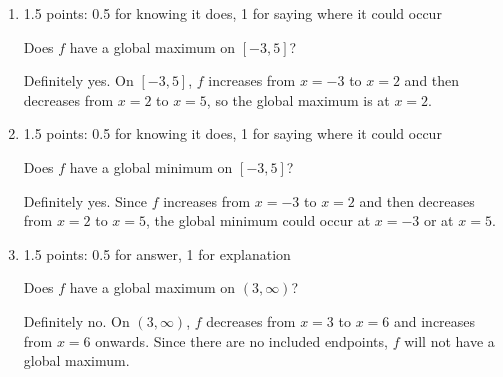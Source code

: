 \documentclass{article}
\begin{document}
\begin{enumerate}
  \begin{enumerate}
  \item

    \begin{grading}
      1.5 points: 0.5 for knowing it does, 1 for saying where it could occur
    \end{grading}

    \begin{problem}[\vfill]
      Does $f$ have a global maximum on $[-3, 5]$? 
    \end{problem}

    \begin{solution}
      Definitely yes. On $[-3, 5]$, $f$ increases from $x=-3$ to $x=2$ and
      then decreases from $x=2$ to $x=5$, so the global maximum is at $x=2$. 
    \end{solution}

  \item

    \begin{grading}
      1.5 points: 0.5 for knowing it does, 1 for saying where it could occur
    \end{grading}

    \begin{problem}[\vfill]
      Does $f$ have a global minimum on $[-3, 5]$? 
    \end{problem}

    \begin{solution}
      Definitely yes. Since $f$ increases 
      from $x=-3$ to $x=2$ and then decreases from $x=2$ to $x=5$, the global minimum
      could occur at $x=-3$ or at $x=5$. 
    \end{solution}

  \item

    \begin{grading}
      1.5 points: 0.5 for answer, 1 for explanation 
    \end{grading}

    \begin{problem}[\vfill\newpage]
      Does $f$ have a global maximum on $(3, \infty)$?
    \end{problem}

    \begin{solution}
      Definitely no. On $(3, \infty)$, $f$ decreases from $x=3$ to $x=6$ and
      increases from $x=6$ onwards. Since there are no included endpoints, $f$
      will not have a global maximum.
    \end{solution}


\end{enumerate}
\end{enumerate}
\end{document}
